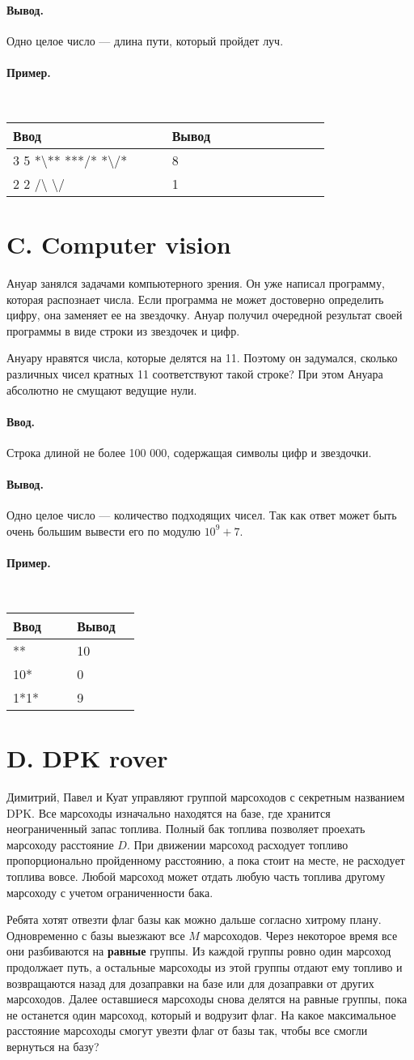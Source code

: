 \documentclass[12pt, a5paper]{article}
\newcommand{\informat}[1]
{
	\paragraph{Ввод.\\} #1
}
\newcommand{\outformat}[1]
{
	\paragraph{Вывод.\\} #1
}
\newcommand{\examplee}[4]
{
	\paragraph{Пример.\\}
	{\tt
	\begin{tabular}{|p{0.4\linewidth}|p{0.4\linewidth}|}
	\hline
	Ввод 	& Вывод  	\\
	\hline
	#1 		& #2 		\\
	\hline
	#3		& #4		\\
	\hline
	\end{tabular}
	}
}
\newcommand{\exampleee}[6]
{
	\paragraph{Пример.\\}
	{\tt
	\begin{tabular}{|p{0.4\linewidth}|p{0.4\linewidth}|}
	\hline
	Ввод 	& Вывод  	\\
	\hline
	#1 		& #2 		\\
	\hline
	#3		& #4		\\
	\hline
	#5		& #6		\\
	\hline
	\end{tabular}
	}
}
\begin{document}
\outformat{Одно целое число --- длина пути, который пройдет луч.}

\examplee
{
3 5 \newline
*\textbackslash***\newline
***/*\newline
*\textbackslash*/*
}
{8}
{
2 2 \newline
/\textbackslash \newline
\textbackslash/}
{1}




\section*{C. Computer vision}
 

Ануар занялся задачами компьютерного зрения. Он уже написал программу, которая распознает числа. Если программа не может достоверно определить цифру, она заменяет ее на звездочку. Ануар получил очередной результат своей программы в виде строки из звездочек и цифр. 

Ануару нравятся числа, которые делятся на 11. Поэтому он задумался, сколько различных чисел кратных 11 соответствуют такой строке? При этом Ануара абсолютно не смущают ведущие нули.

\informat{Строка длиной не более 100 000, содержащая символы цифр и звездочки.}

\outformat{Одно целое число --- количество подходящих чисел. Так как ответ может быть очень большим вывести его по модулю $10^9+7$.}

\exampleee{**}{10}{10*}{0}{1*1*}{9}




\section*{D. DPK rover}
 

Димитрий, Павел и Куат управляют группой марсоходов с секретным названием DPK. Все марсоходы изначально находятся на базе, где хранится неограниченный запас топлива. Полный бак топлива позволяет проехать марсоходу расстояние $D$. При движении марсоход расходует топливо пропорционально пройденному расстоянию, а пока стоит на месте, не расходует топлива вовсе. Любой марсоход может отдать любую часть топлива другому марсоходу с учетом ограниченности бака.

Ребята хотят отвезти флаг базы как можно дальше согласно хитрому плану. Одновременно с базы выезжают все $M$ марсоходов. Через некоторое время все они разбиваются на \textbf{равные} группы. Из каждой группы ровно один марсоход продолжает путь, а остальные марсоходы из этой группы отдают ему топливо и возвращаются назад для дозаправки на базе или для дозаправки от других марсоходов. Далее оставшиеся марсоходы снова делятся на равные группы, пока не останется один марсоход, который и водрузит флаг. На какое максимальное расстояние марсоходы смогут увезти флаг от базы так, чтобы все смогли вернуться на базу?
\end{document}

